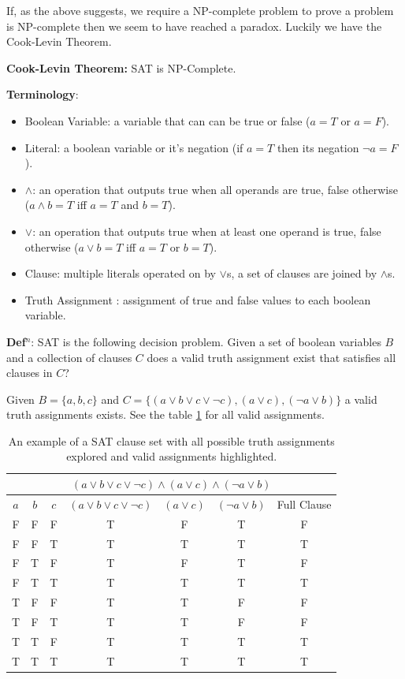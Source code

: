 \documentclass[a4paper,11pt]{report}
\newcounter{row}
\newcounter{col}
\begin{document}
If, as the above suggests, we require a NP-complete problem to prove a problem is NP-complete then we seem to have reached a paradox. Luckily we have the Cook-Levin Theorem.

\textbf{Cook-Levin Theorem:} SAT is NP-Complete. \cite{compcomplexityamodernapproach}

\textbf{Terminology}:
\begin{itemize}
\item Boolean Variable: a variable that can can be true or false ($a=T$ or $a=F$).
\item Literal: a boolean variable or it's negation (if $a = T$ then its negation $\neg a = F$).
\item $\land$: an operation that outputs true when all operands are true, false otherwise ($a\land b = T$ iff $a=T$ and $b=T$).
\item $\lor$: an operation that outputs true when at least one operand is true, false otherwise ($a\lor b = T$ iff $a=T$ or $b=T$).
\item Clause: multiple literals operated on by $\lor$s, a set of clauses are joined by $\land$s.
\item Truth Assignment : assignment of true and false values to each boolean variable. 
\end{itemize}

\textbf{Def$^n$}: SAT is the following decision problem. Given a set of boolean variables $B$ and a collection of clauses $C$ does a valid truth assignment exist that satisfies all clauses in $C$?

Given $B = \{a,b,c\}$ and  $C=\{(a\lor b \lor c \lor \neg c), (a \lor c), (\neg a\lor b)\}$ a valid truth assignments exists. See the table \ref{satex} for all valid assignments.

\begin{table}
\begin{center}
\begin{tabular}{ |c|c|c|c|c|c|c|  }
 \hline
 \multicolumn{7}{|c|}{$(a\lor b \lor c \lor \neg c)\land (a \lor c) \land (\neg a\lor b)$} \\
 \hline
$a$ & $b$ & $c$ & $(a\lor b \lor c \lor \neg c)$ & $(a \lor c)$ & $(\neg a\lor b)$ & Full Clause\\
 \hline
 F & F & F & T & F & T & F \\
\rowcolor{lightgray}
 F & F & T & T & T & T & T \\
 F & T & F & T & F & T & F \\
\rowcolor{lightgray}
 F & T & T & T & T & T & T \\
 T & F & F & T & T & F & F \\
 T & F & T & T & T & F & F \\
\rowcolor{lightgray}
 T & T & F & T & T & T & T \\
\rowcolor{lightgray}
 T & T & T & T & T & T & T \\
 \hline
\end{tabular}
\end{center}
\caption{\label{satex}An example of a SAT clause set with all possible truth assignments explored and valid assignments highlighted.}
\end{table}
\end{document}
